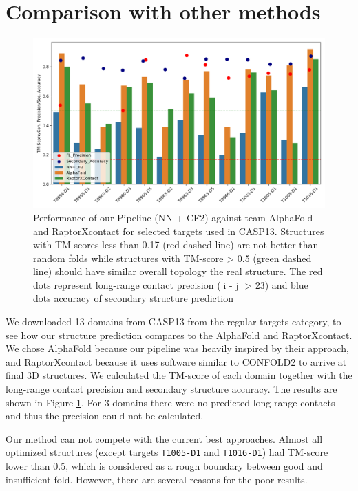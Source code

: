 \section{Comparison with other methods}

\begin{figure}
    \centering
    \includegraphics[width=\linewidth]{imgs_tomas/long_range_casp13_tm_contacts_sec.png}
    \caption{Performance of our Pipeline (NN + CF2) against team AlphaFold and RaptorXcontact for selected targets used in CASP13. Structures with TM-scores less than 0.17 (red dashed line) are not better than random folds while structures with TM-score > 0.5 (green dashed line) should have similar overall topology the real structure. The red dots represent long-range contact precision (|i - j| > 23) and blue dots accuracy of secondary structure prediction}
    \label{fig:casp_performance}
\end{figure}

We downloaded 13 domains from CASP13 from the regular targets category, to see how our structure prediction compares to the AlphaFold and RaptorXcontact. We chose AlphaFold because our pipeline was heavily inspired by their approach, and RaptorXcontact because it uses software similar to CONFOLD2 to arrive at final 3D structures. We calculated the TM-score of each domain together with the long-range contact precision and secondary structure accuracy. The results are shown in Figure \ref{fig:casp_performance}. For 3 domains there were no predicted long-range contacts and thus the precision could not be calculated.

Our method can not compete with the current best approaches. Almost all optimized structures (except targets \texttt{T1005-D1} and \texttt{T1016-D1}) had TM-score lower than 0.5, which is considered as a rough boundary between good and insufficient fold. However, there are several reasons for the poor results.

